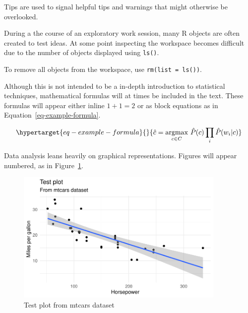 \documentclass[
  letterpaper,
]{latex/krantz}
\begin{document}
Tips are used to signal helpful tips and warnings that might otherwise
be overlooked.

\begin{tcolorbox}[enhanced jigsaw, toprule=.15mm, bottomtitle=1mm, coltitle=black, title=\textcolor{quarto-callout-warning-color}{\faExclamationTriangle}\hspace{0.5em}{Tip}, left=2mm, colframe=quarto-callout-warning-color-frame, bottomrule=.15mm, colbacktitle=quarto-callout-warning-color!10!white, leftrule=.75mm, colback=white, titlerule=0mm, breakable, toptitle=1mm, opacityback=0, arc=.35mm, rightrule=.15mm, opacitybacktitle=0.6]

During a the course of an exploratory work session, many R objects are
often created to test ideas. At some point inspecting the workspace
becomes difficult due to the number of objects displayed using
\texttt{ls()}.

To remove all objects from the workspace, use
\texttt{rm(list\ =\ ls())}.

\end{tcolorbox}

Although this is not intended to be a in-depth introduction to
statistical techniques, mathematical formulas will at times be included
in the text. These formulas will appear either inline \(1 + 1 = 2\) or
as block equations as in Equation~\ref{eq-example-formula}.

\begin{equation}\protect\hypertarget{eq-example-formula}{}{
\hat{c} = \underset{c \in C} {\mathrm{argmax}} ~\hat{P}(c) \prod_i \hat{P}(w_i|c)
}\label{eq-example-formula}\end{equation}

Data analysis leans heavily on graphical representations. Figures will
appear numbered, as in Figure~\ref{fig-test-fig}.

\begin{figure}[h]

{\centering \includegraphics[width=0.9\textwidth,height=\textheight]{./preface_files/figure-pdf/fig-test-fig-1.pdf}

}

\caption{\label{fig-test-fig}Test plot from mtcars dataset}

\end{figure}
\end{document}
